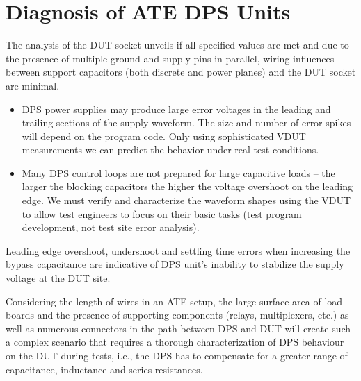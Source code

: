 

\section{Diagnosis of \acs{ATE} \acs{DPS} Units}
\label{sec:diagnostic-problems-ate-dps}

The analysis of the \ac{DUT} socket unveils if all specified values are met
and due to the presence of multiple ground and supply pins in parallel,
wiring influences between support capacitors (both discrete and power planes)
and the \ac{DUT} socket are minimal.

\begin{itemize}[topsep=8pt,itemsep=4pt,partopsep=4pt, parsep=4pt]
    \item \ac{DPS} power supplies may produce large error voltages in the
    leading and trailing sections of the supply waveform.
    The size and number of error spikes will depend on the program code.
    Only using sophisticated \ac{VDUT} measurements we can predict the behavior
    under real test conditions.

    \item Many \ac{DPS} control loops are not prepared for large capacitive
    loads – the larger the blocking capacitors the higher the voltage overshoot
    on the leading edge.
    We must verify and characterize the waveform shapes using the \ac{VDUT}
    to allow test engineers to focus on their basic tasks (test program
    development, not test site error analysis).

\end{itemize}

Leading edge overshoot, undershoot and settling time errors
when increasing the bypass capacitance are indicative of \ac{DPS} unit's
inability to stabilize the supply voltage at the \ac{DUT} site.

Considering the length of wires in an \ac{ATE} setup, the large surface area of
load boards and the presence of supporting components (relays, multiplexers,
etc.) as well as numerous connectors in the path between \ac{DPS} and \ac{DUT}
will create such a complex scenario that requires a thorough characterization
of \ac{DPS} behaviour on the \ac{DUT} during tests, i.e., the \ac{DPS} has to
compensate for a greater range of capacitance, inductance and series
resistances.



